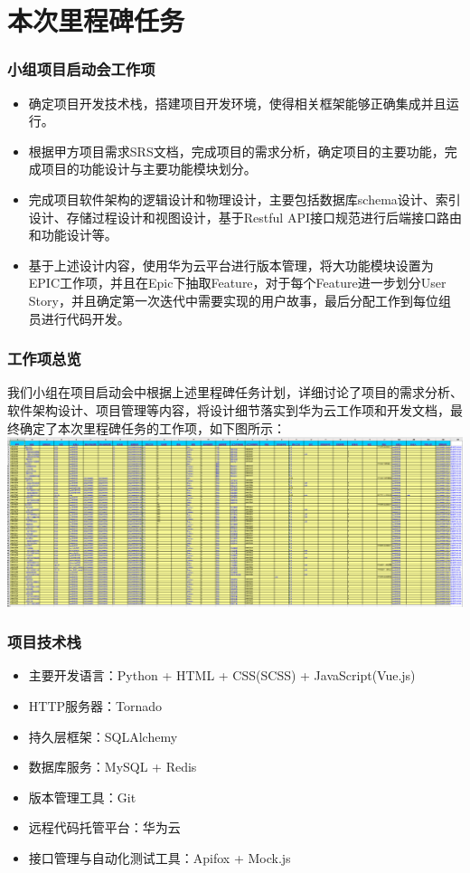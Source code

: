 \section{本次里程碑任务}
\begin{frame}
    \frametitle{小组项目启动会工作项}
    \begin{itemize}
        \item 确定项目开发技术栈，搭建项目开发环境，使得相关框架能够正确集成并且运行。
        \item 根据甲方项目需求SRS文档，完成项目的需求分析，确定项目的主要功能，完成项目的功能设计与主要功能模块划分。
        \item 完成项目软件架构的逻辑设计和物理设计，主要包括数据库schema设计、索引设计、存储过程设计和视图设计，基于Restful API接口规范进行后端接口路由和功能设计等。
        \item 基于上述设计内容，使用华为云平台进行版本管理，将大功能模块设置为EPIC工作项，并且在Epic下抽取Feature，对于每个Feature进一步划分User Story，并且确定第一次迭代中需要实现的用户故事，最后分配工作到每位组员进行代码开发。
    \end{itemize}
\end{frame}

\begin{frame}
    \frametitle{工作项总览}
    我们小组在项目启动会中根据上述里程碑任务计划，详细讨论了项目的需求分析、软件架构设计、项目管理等内容，将设计细节落实到华为云工作项和开发文档，最终确定了本次里程碑任务的工作项，如下图所示：
        \includegraphics[width=2\textwidth]{contents/figure/work_items_overall.png}
\end{frame}

\begin{frame}
    \frametitle{项目技术栈}
    \begin{itemize}
        \item 主要开发语言：Python + HTML + CSS(SCSS) + JavaScript(Vue.js)
        \item HTTP服务器：Tornado
        \item 持久层框架：SQLAlchemy
        \item 数据库服务：MySQL + Redis
        \item 版本管理工具：Git
        \item 远程代码托管平台：华为云
        \item 接口管理与自动化测试工具：Apifox + Mock.js
    \end{itemize}
\end{frame}
